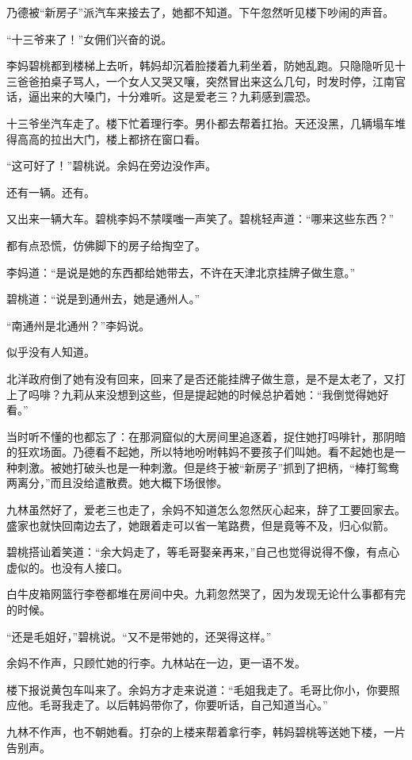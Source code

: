 \par 乃德被“新房子”派汽车来接去了，她都不知道。下午忽然听见楼下吵闹的声音。
\par “十三爷来了！”女佣们兴奋的说。
\par 李妈碧桃都到楼梯上去听，韩妈却沉着脸搂着九莉坐着，防她乱跑。只隐隐听见十三爸爸拍桌子骂人，一个女人又哭又嚷，突然冒出来这么几句，时发时停，江南官话，逼出来的大嗓门，十分难听。这是爱老三？九莉感到震恐。
\par 十三爷坐汽车走了。楼下忙着理行李。男仆都去帮着扛抬。天还没黑，几辆塌车堆得高高的拉出大门，楼上都挤在窗口看。
\par “这可好了！”碧桃说。余妈在旁边没作声。
\par 还有一辆。还有。
\par 又出来一辆大车。碧桃李妈不禁噗嗤一声笑了。碧桃轻声道：“哪来这些东西？”
\par 都有点恐慌，仿佛脚下的房子给掏空了。
\par 李妈道：“是说是她的东西都给她带去，不许在天津北京挂牌子做生意。”
\par 碧桃道：“说是到通州去，她是通州人。”
\par “南通州是北通州？”李妈说。
\par 似乎没有人知道。
\par 北洋政府倒了她有没有回来，回来了是否还能挂牌子做生意，是不是太老了，又打上了吗啡？九莉从来没想到这些，但是提起她的时候总护着她：“我倒觉得她好看。”
\par 当时听不懂的也都忘了：在那洞窟似的大房间里追逐着，捉住她打吗啡针，那阴暗的狂欢场面。乃德看不起她，所以特地吩咐韩妈不要孩子们叫她。看不起她也是一种刺激。被她打破头也是一种刺激。但是终于被“新房子”抓到了把柄，“棒打鸳鸯两离分，”而且没给遣散费。她大概下场很惨。
\par 九林虽然好了，爱老三也走了，余妈不知道怎么忽然灰心起来，辞了工要回家去。盛家也就快回南边去了，她跟着走可以省一笔路费，但是竟等不及，归心似箭。
\par 碧桃搭讪着笑道：“余大妈走了，等毛哥娶亲再来，”自己也觉得说得不像，有点心虚似的。也没有人接口。
\par 白牛皮箱网篮行李卷都堆在房间中央。九莉忽然哭了，因为发现无论什么事都有完的时候。
\par “还是毛姐好，”碧桃说。“又不是带她的，还哭得这样。”
\par 余妈不作声，只顾忙她的行李。九林站在一边，更一语不发。
\par 楼下报说黄包车叫来了。余妈方才走来说道：“毛姐我走了。毛哥比你小，你要照应他。毛哥我走了。以后韩妈带你了，你要听话，自己知道当心。”
\par 九林不作声，也不朝她看。打杂的上楼来帮着拿行李，韩妈碧桃等送她下楼，一片告别声。
